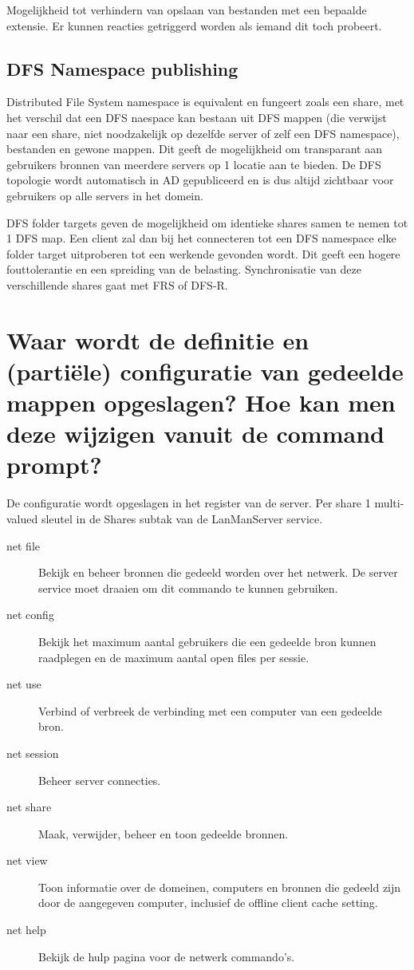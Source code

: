 Mogelijkheid tot verhindern van opslaan van bestanden met een bepaalde extensie.
Er kunnen reacties getriggerd worden als iemand dit toch probeert.

\subsection{DFS Namespace publishing}

Distributed File System namespace is equivalent en fungeert zoals een share, met
het verschil dat een DFS naespace kan bestaan uit DFS mappen (die verwijst naar
een share, niet noodzakelijk op dezelfde server of zelf een DFS namespace),
bestanden en gewone mappen. Dit geeft de mogelijkheid om transparant aan
gebruikers bronnen van meerdere servers op 1 locatie aan te bieden. De DFS
topologie wordt automatisch in AD gepubliceerd en is dus altijd zichtbaar voor
gebruikers op alle servers in het domein.

DFS folder targets geven de mogelijkheid om identieke shares samen te nemen tot
1 DFS map. Een client zal dan bij het connecteren tot een DFS namespace elke
folder target uitproberen tot een werkende gevonden wordt. Dit geeft een hogere
fouttolerantie en een spreiding van de belasting. Synchronisatie van deze
verschillende shares gaat met FRS of DFS-R.

\section{Waar wordt de definitie en (partiële) configuratie van gedeelde mappen
opgeslagen? Hoe kan men deze wijzigen vanuit de command prompt?}

De configuratie wordt opgeslagen in het register van de server. Per share 1
multi-valued sleutel in de Shares subtak van de LanManServer service.

\begin{description}
	\item[net file] Bekijk en beheer bronnen die gedeeld worden over het
		netwerk. De server service moet draaien om dit commando te
		kunnen gebruiken.
	\item[net config] Bekijk het maximum aantal gebruikers die een gedeelde
		bron kunnen raadplegen en de maximum aantal open files per
		sessie.
	\item[net use] Verbind of verbreek de verbinding met een computer van
		een gedeelde bron.
	\item[net session] Beheer server connecties.
	\item[net share] Maak, verwijder, beheer en toon gedeelde bronnen.
	\item[net view] Toon informatie over de domeinen, computers en bronnen
		die gedeeld zijn door de aangegeven computer, inclusief de
		offline client cache setting.
	\item[net help] Bekijk de hulp pagina voor de netwerk commando's.

\end{description}

